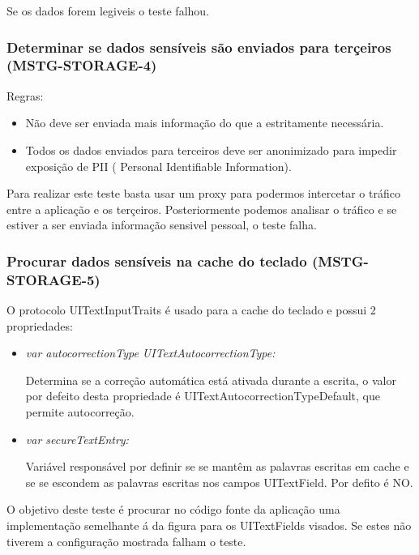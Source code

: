 Se os dados forem legiveis o teste falhou.


\subsubsection{Determinar se dados sensíveis são enviados para terçeiros (MSTG-STORAGE-4)}
\hfill\par
\hfill\par
Regras:
\begin{itemize}
\item Não deve ser enviada mais informação do que a estritamente necessária.
\item Todos os dados enviados para terceiros deve ser anonimizado para impedir exposição de PII (	Personal Identifiable Information).
\end{itemize}
Para realizar este teste basta usar um proxy para podermos intercetar o tráfico entre a aplicação e os terçeiros. Posteriormente podemos analisar o tráfico e se estiver a ser enviada informação sensivel pessoal, o teste falha.



\subsubsection{Procurar dados sensíveis na cache do teclado (MSTG-STORAGE-5)}
\hfill\par
\hfill\par

   O protocolo UITextInputTraits é usado para a cache do teclado e possui 2 propriedades: 
\begin{itemize}

   		\item \textit{var autocorrectionType UITextAutocorrectionType:} 

   			Determina se a correção automática está ativada durante a escrita, o valor por defeito desta propriedade é UITextAutocorrectionTypeDefault, que permite autocorreção. \par
   			\hfill\par

   		\item \textit{var secureTextEntry:}

   			Variável responsável por definir se se mantêm as palavras escritas em cache e se se escondem as palavras escritas nos campos UITextField. Por defito é NO.
\end{itemize}


   	O objetivo deste teste é procurar no código fonte da aplicação uma implementação semelhante á da figura para os UITextFields visados. Se estes não tiverem a configuração mostrada falham o teste.

